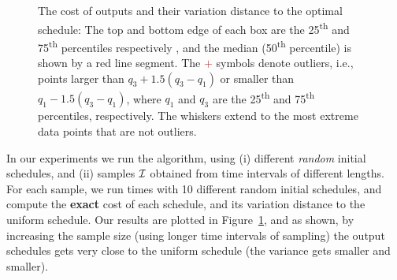 \begin{figure}[htbp]
	\caption{\scriptsize The cost of \algonameapx outputs and their variation
	distance to the optimal schedule: The top and bottom edge of each box are
	the 25\textsuperscript{th}
	and 75\textsuperscript{th} percentiles respectively , and the median
	(50\textsuperscript{th} percentile) is shown by a red line segment.
	The \textcolor{red}{$+$} symbols denote outliers, i.e., points larger than
	$q_3 + 1.5(q_3 - q_1)$ or smaller than $q_1 - 1.5(q_3 - q_1)$, where $q_1$
	and $q_3$ are the 25\textsuperscript{th} and 75\textsuperscript{th}
	percentiles, respectively. The whiskers extend to the most extreme data
	points that are not outliers.
	} \label{fig:unique}
\end{figure}
In our experiments we run the \algonameapx algorithm, using (i) different \emph{random} initial schedules, and (ii) samples $\mathcal{I}$ obtained from time intervals of different lengths. For each sample, we run  times with 10 different random initial schedules, and compute the \textbf{exact} cost of each schedule, and its variation distance to the uniform schedule. Our results are plotted in Figure~\ref{fig:unique}, and as shown, by increasing the sample size (using longer time intervals of sampling) the output schedules gets very close to the uniform schedule (the variance gets smaller and smaller).

